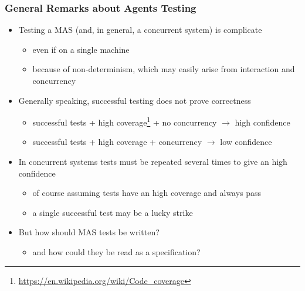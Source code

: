 \documentclass{beamer}\mode<presentation>{\usetheme{AMSCesenaPurpleAndGold}}
\begin{document}
\begin{frame}%
	\frametitle{General Remarks about Agents Testing}
	
	\begin{itemize}
		\item Testing a MAS (and, in general, a concurrent system) is complicate
		\begin{itemize}
			\item even if on a single machine
			\item because of \alert{non-determinism}, which may easily arise from \alert{interaction} and \alert{concurrency}
		\end{itemize}
	
		\vfill
	
		\item Generally speaking, successful testing \alert{does not prove} correctness
		\begin{itemize}
			\item successful tests + high coverage\footnote{\url{https://en.wikipedia.org/wiki/Code_coverage}} + no concurrency $\rightarrow$ high confidence
			\item successful tests + high coverage + concurrency $\rightarrow$ low confidence
		\end{itemize}
	
		\vfill
		
		\item In concurrent systems tests must be repeated \alert{several times} to give an high confidence 
		\begin{itemize}
			\item of course assuming tests have an high coverage and always pass
			\item a single successful test may be a lucky strike
		\end{itemize}
	
		\vfill
		
		\item But how should MAS tests be written?
		\begin{itemize}
			\item and how could they be read as a specification?
		\end{itemize}
		
	\end{itemize}
	
\end{frame}
\end{document}
